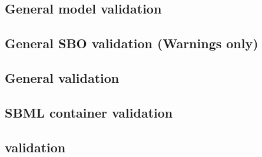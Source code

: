 \begin{sbmlenum}

\end{sbmlenum} \subsection*{General model validation} \begin{sbmlenum}


\end{sbmlenum} \subsection*{General SBO validation (Warnings only)} \begin{sbmlenum}


\end{sbmlenum} \subsection*{General  validation} \begin{sbmlenum}


\end{sbmlenum} \subsection*{SBML container validation} \begin{sbmlenum}


\end{sbmlenum} \subsection*{ validation} \begin{sbmlenum}


\end{sbmlenum}
